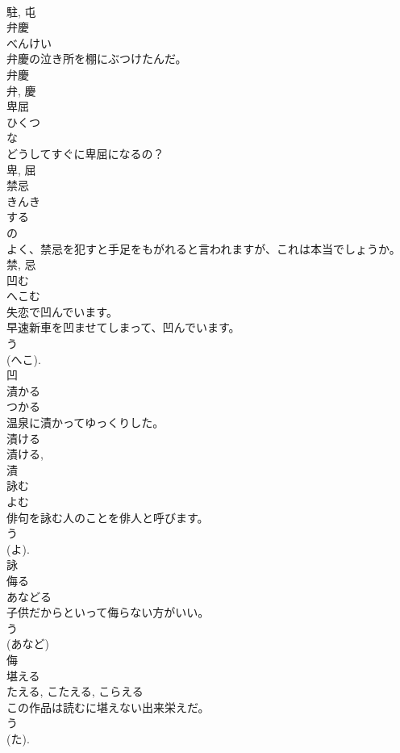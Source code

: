 \documentclass[8pt]{extreport}
\begin{document}
\begin{CJK}{UTF8}{min}
\\	駐, 屯	
\\	弁慶	
\\	べんけい	
\\	弁慶の泣き所を棚にぶつけたんだ。	
\\	弁慶 
\\	弁, 慶	
\\	卑屈	
\\	ひくつ	
\\	な 
\\	どうしてすぐに卑屈になるの？	
\\	卑, 屈	
\\	禁忌	
\\	きんき	
\\	する 
\\	の 
\\	よく、禁忌を犯すと手足をもがれると言われますが、これは本当でしょうか。	
\\	禁, 忌	
\\	凹む	
\\	へこむ	
\\	失恋で凹んでいます。	
\\	早速新車を凹ませてしまって、凹んでいます。	
\\	う 
\\	(へこ). 
\\	凹	
\\	漬かる	
\\	つかる	
\\	温泉に漬かってゆっくりした。	
\\	漬ける 
\\	漬ける, 
\\	漬	
\\	詠む	
\\	よむ	
\\	俳句を詠む人のことを俳人と呼びます。	
\\	う 
\\	(よ). 
\\	詠	
\\	侮る	
\\	あなどる	
\\	子供だからといって侮らない方がいい。	
\\	う 
\\	(あなど) 
\\	侮	
\\	堪える	
\\	たえる, こたえる, こらえる	
\\	この作品は読むに堪えない出来栄えだ。	
\\	う 
\\	(た). 

\end{CJK}
\end{document}
